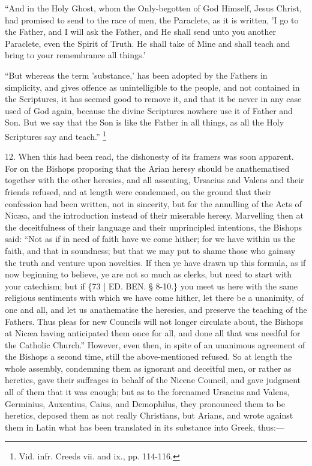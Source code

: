 ``And in the Holy Ghost, whom
the Only-begotten of God Himself, Jesus Christ, had promised to send
to the race of men, the Paraclete, as it is written, 'I go to the
Father, and I will ask the Father, and He shall send unto you another
Paraclete, even the Spirit of Truth. He shall take of Mine and shall
teach and bring to your remembrance all things.'

``But whereas the term
'substance,' has been adopted by the Fathers in simplicity, and gives
offence as unintelligible to the people, and not contained in the
Scriptures, it has seemed good to remove it, and that it be never in
any case used of God again, because the divine Scriptures nowhere use
it of Father and Son. But we say that the Son is like the Father in
all things, as all the Holy Scriptures say and teach.'' \footnote{Vid. infr. Creeds vii. and ix., pp. 114-116.}

12. When this had been read,
the dishonesty of its framers was soon apparent. For on the Bishops
proposing that the Arian heresy should be anathematised together with
the other heresies, and all assenting, Ursacius and Valens and their
friends refused, and at length were condemned, on the ground that
their confession had been written, not in sincerity, but for the
annulling of the Acts of Nicæa, and the introduction instead of their
miserable heresy. Marvelling then at the deceitfulness of their
language and their unprincipled intentions, the Bishops said: ``Not as
if in need of faith have we come hither; for we have within us the
faith, and that in soundness; but that we may put to shame those who
gainsay the truth and venture upon novelties. If then ye have drawn up
this formula, as if now beginning to believe, ye are not so much as
clerks, but need to start with your catechism; but if \{73 | ED. BEN.
§ 8-10.\} you meet us here with the same religious sentiments with
which we have come hither, let there be a unanimity, of one and all,
and let us anathematise the heresies, and preserve the teaching of the
Fathers. Thus pleas for new Councils will not longer circulate about,
the Bishops at Nicæa having anticipated them once for all, and done
all that was needful for the Catholic Church.'' However, even then, in
spite of an unanimous agreement of the Bishops a second time, still
the above-mentioned refused. So at length the whole assembly,
condemning them as ignorant and deceitful men, or rather as heretics,
gave their suffrages in behalf of the Nicene Council, and gave
judgment all of them that it was enough; but as to the forenamed
Ursacius and Valens, Germinius, Auxentius, Caius, and Demophilus, they
pronounced them to be heretics, deposed them as not really Christians,
but Arians, and wrote against them in Latin what has been translated
in its substance into Greek, thus:—

